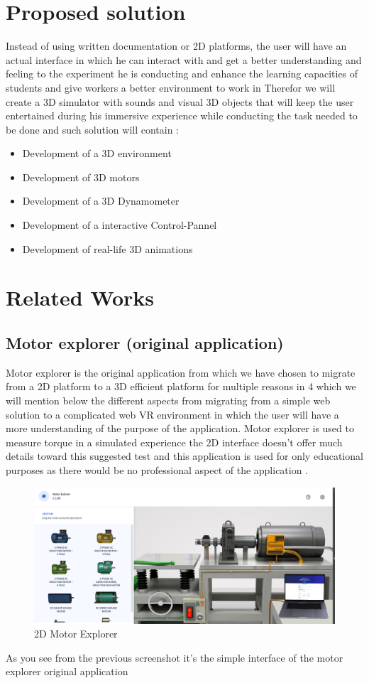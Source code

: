 \documentclass[]{report}
\begin{document}
\section{Proposed solution}
Instead of using written documentation or 2D platforms, the user will have an
actual interface in which he can interact with and get a better understanding and
feeling to the experiment he is conducting and enhance the learning capacities
of students and give workers a better environment to work in
Therefor we will create a 3D simulator with sounds and visual 3D objects that
will keep the user entertained during his immersive experience while
conducting the task needed to be done and such solution will contain :
\begin{itemize}
	\item Development of a 3D environment
	\item Development of 3D motors
	\item Development of a 3D Dynamometer
	\item Development of a interactive Control-Pannel
	\item Development of real-life 3D animations
\end{itemize}

\section{Related Works}
\subsection{Motor explorer (original application)}
Motor explorer is the original application from which we have chosen to
migrate from a 2D platform to a 3D efficient platform for multiple reasons in
4
which we will mention below the different aspects from migrating from a
simple web solution to a complicated web VR environment in which the user
will have a more understanding of the purpose of the application.
Motor explorer is used to measure torque in a simulated experience the 2D
interface doesn’t offer much details toward this suggested test and this
application is used for only educational purposes as there would be no
professional aspect of the application .

\begin{figure}[H]
	\begin{center}
		\includegraphics[scale=0.5]{2dMotorExplorer.png}
	\end{center}
	\caption{2D Motor Explorer}
\end{figure}
As you see from the previous screenshot it’s the simple interface of the motor
explorer original application
\end{document}
